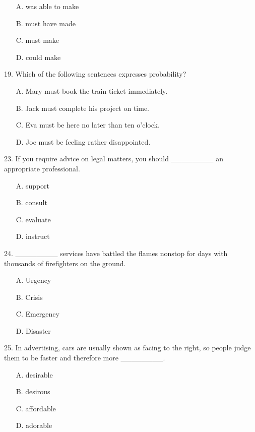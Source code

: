 \documentclass[UTF8,11pt]{ctexart}
\begin{document}
\begin{itemize}[leftmargin=2em,itemsep=.2em,topsep=.4em]\item[A.] was able to make
\item[B.] must have made
\item[C.] must make
\item[D.] could make
\end{itemize}

19. Which of the following sentences expresses probability?


\begin{itemize}[leftmargin=2em,itemsep=.2em,topsep=.4em]\item[A.] Mary must book the train ticket immediately.
\item[B.] Jack must complete his project on time.
\item[C.] Eva must be here no later than ten o’clock.
\item[D.] Joe must be feeling rather disappointed.
\end{itemize}

23. If you require advice on legal matters, you should \_\_\_\_\_\_\_\_ an appropriate professional.


\begin{itemize}[leftmargin=2em,itemsep=.2em,topsep=.4em]\item[A.] support
\item[B.] consult
\item[C.] evaluate
\item[D.] instruct
\end{itemize}

24. \_\_\_\_\_\_\_\_ services have battled the flames nonstop for days with thousands of firefighters on the ground.


\begin{itemize}[leftmargin=2em,itemsep=.2em,topsep=.4em]\item[A.] Urgency
\item[B.] Crisis
\item[C.] Emergency
\item[D.] Disaster
\end{itemize}

25. In advertising, cars are usually shown as facing to the right, so people judge them to be faster and therefore more \_\_\_\_\_\_\_\_.


\begin{itemize}[leftmargin=2em,itemsep=.2em,topsep=.4em]\item[A.] desirable
\item[B.] desirous
\item[C.] affordable
\item[D.] adorable
\end{itemize}
\end{document}

